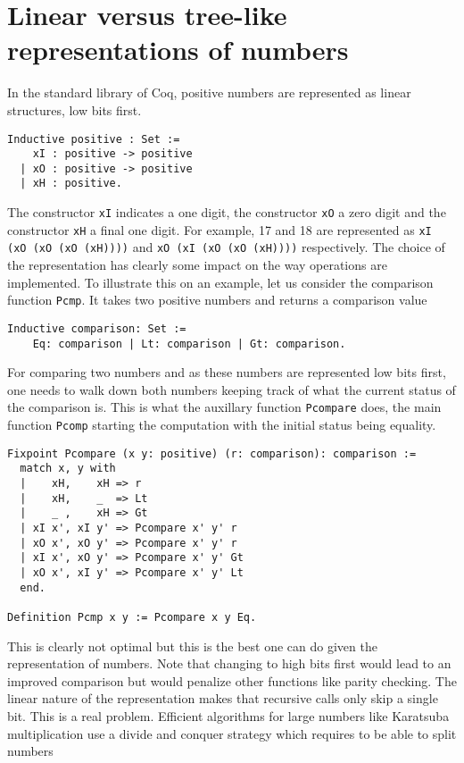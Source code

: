\section{Linear versus tree-like representations of numbers\label{ZTree}}

In the standard library of {\sc Coq}, positive numbers are represented as linear structures, low bits first.

\begin{verbatim}
Inductive positive : Set :=
    xI : positive -> positive 
  | xO : positive -> positive 
  | xH : positive.
\end{verbatim}
The constructor {\tt xI} indicates a one digit, the constructor {\tt xO}
a zero digit and the constructor {\tt xH} a final one digit.
For example, 17 and 18 are represented as {\tt xI (xO (xO (xO (xH))))} and
{\tt xO (xI (xO (xO (xH))))} respectively. The choice of the representation
has clearly some impact on the way operations are implemented. To illustrate this on an example,
let us consider the comparison function {\tt Pcmp}. It takes two positive numbers
and returns a comparison value
\begin{verbatim}
Inductive comparison: Set :=
    Eq: comparison | Lt: comparison | Gt: comparison.
\end{verbatim}
For comparing two numbers and as these numbers are represented low bits first,
one needs to walk down both numbers keeping track of what the current status
of the comparison is. This is what the auxillary function {\tt Pcompare} does, the main 
function {\tt Pcomp} starting the computation with the initial status being equality.
\begin{verbatim}
Fixpoint Pcompare (x y: positive) (r: comparison): comparison :=
  match x, y with
  |    xH,    xH => r
  |    xH,    _  => Lt
  |    _ ,    xH => Gt
  | xI x', xI y' => Pcompare x' y' r
  | xO x', xO y' => Pcompare x' y' r
  | xI x', xO y' => Pcompare x' y' Gt
  | xO x', xI y' => Pcompare x' y' Lt
  end.
  
Definition Pcmp x y := Pcompare x y Eq.
\end{verbatim}
This is clearly not optimal but this is the best one can do given the representation
of numbers. Note that changing to high bits first would lead to an improved
comparison but would penalize other functions like parity checking. The linear
nature of the representation makes that recursive calls only skip a single
bit. This is a real problem. Efficient algorithms for large numbers like Karatsuba 
multiplication use a divide and conquer strategy which requires to be able to split numbers
